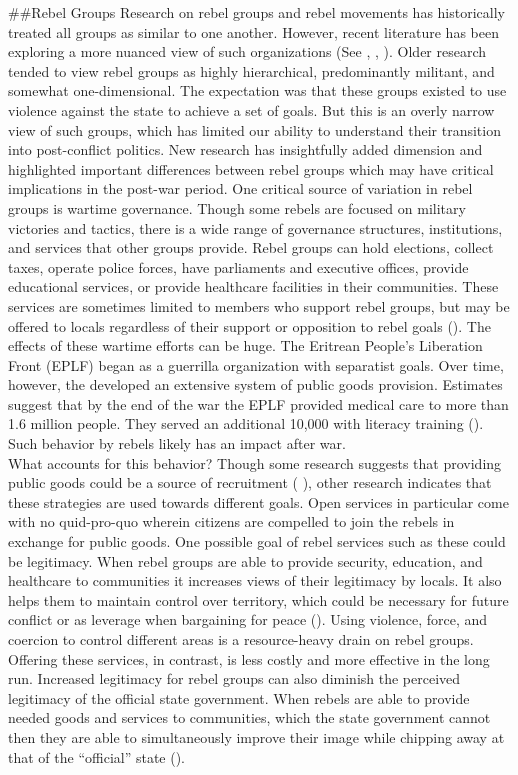 \documentclass[11pt,]{article}
\begin{document}
\#\#Rebel Groups Research on rebel groups and rebel movements has
historically treated all groups as similar to one another. However,
recent literature has been exploring a more nuanced view of such
organizations (See \citet{huang_wartime_2016},
\citet{stewart_civil_2016}, \citet{terpstra_rebel_2017}). Older research
tended to view rebel groups as highly hierarchical, predominantly
militant, and somewhat one-dimensional. The expectation was that these
groups existed to use violence against the state to achieve a set of
goals. But this is an overly narrow view of such groups, which has
limited our ability to understand their transition into post-conflict
politics. New research has insightfully added dimension and highlighted
important differences between rebel groups which may have critical
implications in the post-war period. One critical source of variation in
rebel groups is wartime governance. Though some rebels are focused on
military victories and tactics, there is a wide range of governance
structures, institutions, and services that other groups provide. Rebel
groups can hold elections, collect taxes, operate police forces, have
parliaments and executive offices, provide educational services, or
provide healthcare facilities in their communities. These services are
sometimes limited to members who support rebel groups, but may be
offered to locals regardless of their support or opposition to rebel
goals (\citet{huang_wartime_2016}). The effects of these wartime efforts
can be huge. The Eritrean People's Liberation Front (EPLF) began as a
guerrilla organization with separatist goals. Over time, however, the
developed an extensive system of public goods provision. Estimates
suggest that by the end of the war the EPLF provided medical care to
more than 1.6 million people. They served an additional 10,000 with
literacy training (\citet{stewart_civil_2018}). Such behavior by rebels
likely has an impact after war.\\
What accounts for this behavior? Though some research suggests that
providing public goods could be a source of recruitment (
\citet{berman_religion_2008}), other research indicates that these
strategies are used towards different goals. Open services in particular
come with no quid-pro-quo wherein citizens are compelled to join the
rebels in exchange for public goods. One possible goal of rebel services
such as these could be legitimacy. When rebel groups are able to provide
security, education, and healthcare to communities it increases views of
their legitimacy by locals. It also helps them to maintain control over
territory, which could be necessary for future conflict or as leverage
when bargaining for peace (\citet{terpstra_rebel_2017}). Using violence,
force, and coercion to control different areas is a resource-heavy drain
on rebel groups. Offering these services, in contrast, is less costly
and more effective in the long run. Increased legitimacy for rebel
groups can also diminish the perceived legitimacy of the official state
government. When rebels are able to provide needed goods and services to
communities, which the state government cannot then they are able to
simultaneously improve their image while chipping away at that of the
``official'' state (\citet{terpstra_rebel_2017}).
\end{document}
